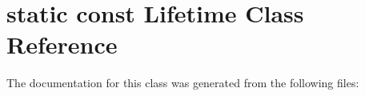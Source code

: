 \hypertarget{classstatic_01const_01Lifetime}{}\section{static const Lifetime Class Reference}
\label{classstatic_01const_01Lifetime}


The documentation for this class was generated from the following files\+:
